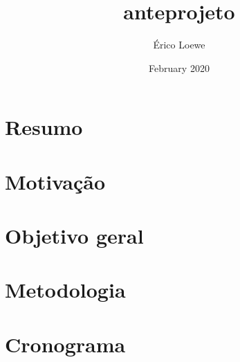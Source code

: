 \documentclass{article}
\title{anteprojeto}
\author{Érico Loewe}
\date{February 2020}
\begin{document}
\maketitle

\section{Resumo}
\section{Motivação}
\section{Objetivo geral}
\section{Metodologia}
\section{Cronograma}
\end{document}
